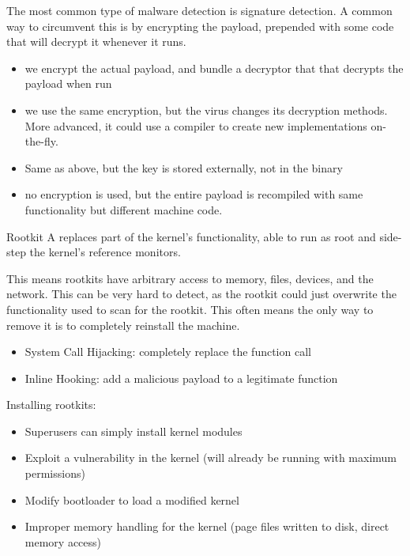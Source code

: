\documentclass[code]{amznotes}
\begin{document}
The most common type of malware detection is signature detection. A common way to circumvent this is by encrypting the payload, prepended with some code that will decrypt it whenever it runs.
\begin{itemize}
    \item {} we encrypt the actual payload, and bundle a decryptor that that decrypts the payload when run
    \item {} we use the same encryption, but the virus changes its decryption methods. More advanced, it could use a compiler to create new implementations on-the-fly.
    \item {} Same as above, but the key is stored externally, not in the binary
    \item {} no encryption is used, but the entire payload is recompiled with same functionality but different machine code.
\end{itemize}

\begin{dfnbox}{Rootkit}{}
    A  replaces part of the kernel's functionality, able to run as root and side-step the kernel's reference monitors.
\end{dfnbox}

This means rootkits have arbitrary access to memory, files, devices, and the network. This can be very hard to detect, as the rootkit could just overwrite the functionality used to scan for the rootkit. This often means the only way to remove it is to completely reinstall the machine.

\begin{itemize}
    \item System Call Hijacking: completely replace the function call
    \item Inline Hooking: add a malicious payload to a legitimate function
\end{itemize}

Installing rootkits:
\begin{itemize}
    \item Superusers can simply install kernel modules
    \item Exploit a vulnerability in the kernel (will already be running with maximum permissions)
    \item Modify bootloader to load a modified kernel
    \item Improper memory handling for the kernel  (page files written to disk, direct memory access)
\end{itemize}
\end{document}
